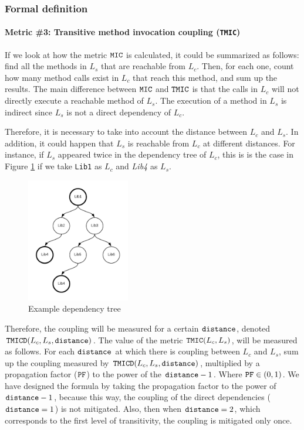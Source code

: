 \subsubsection{Formal definition}

\paragraph{Metric \#3: Transitive method invocation coupling (\texttt{TMIC})}
If we look at how the metric $\verb|MIC|$ is calculated, it could be summarized as follows: find all the methods in $L_s$ that are reachable from $L_c$. Then, for each one, count how many method calls exist in $L_c$ that reach this method, and sum up the results. The main difference between $\verb|MIC|$ and $\verb|TMIC|$ is that the calls in $L_c$ will not directly execute a reachable method of $L_s$. The execution of a method in $L_s$ is indirect since $L_s$ is not a direct dependency of $L_c$.

Therefore, it is necessary to take into account the distance between $L_c$ and $L_s$. In addition, it could happen that $L_s$ is reachable from $L_c$ at different distances. For instance, if $L_s$ appeared twice in the dependency tree of $L_c$, this is is the case in Figure \ref{fig:dependency-tree} if we take \texttt{Lib1} as $L_c$ and \textit{Lib4} as $L_s$.

\begin{figure}[ht]
\begin{center}
\includegraphics[width=0.4\textwidth]{figures/Thesis-DependencyTree.png}
\caption{Example dependency tree}
\label{fig:dependency-tree}
\end{center}
\end{figure}

Therefore, the coupling will be measured for a certain $\verb|distance|$, denoted $\verb|TMICD|(L_c,L_s, \verb|distance|)$.
The value of the metric $\verb|TMIC|(L_c,L_s)$, will be measured as follows. For each $\verb|distance|$ at which there is coupling between $L_c$ and $L_s$, sum up the coupling measured by $\verb|TMICD|(L_c,L_s, \verb|distance|)$, multiplied by a propagation factor ($\verb|PF|$) to the power of the $\verb|distance| - 1$. Where $\verb|PF| \in (0,1)$. We have designed the formula by taking the propagation factor to the power of $\verb|distance| - 1$, because this way, the coupling of the direct dependencies ($\verb|distance| = 1$) is not mitigated. Also, then when $\verb|distance| = 2$, which corresponds to the first level of transitivity, the coupling is mitigated only once.

